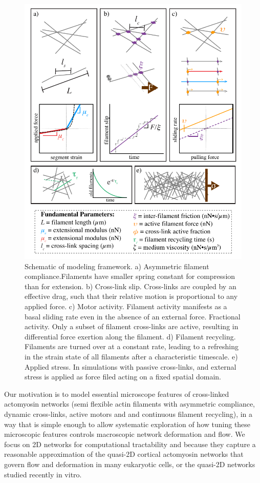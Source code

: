 \documentclass[10pt,letterpaper]{article}
\begin{document}
\begin{figure}[h!]
\centering
\includegraphics[width=\hsize]{figures/fig2/fig2}
\caption{\label{fig:sim} Schematic of modeling framework. a) Asymmetric filament compliance.Filaments have smaller spring constant for compression than for extension. b) Cross-link slip. Cross-links are coupled by an effective drag, such that their relative motion is
proportional to any applied force. c) Motor activity. Filament activity manifests as a basal sliding rate even in the absence of an external force. Fractional activity. Only a subset of filament cross-links are active, resulting in differential force exertion along the filament. d) Filament recycling. Filaments are turned over at a constant rate, leading to a refreshing in the strain state of all filaments after a characteristic timescale. e) Applied stress. In simulations with passive cross-links, and external stress is applied as force filed acting on a fixed spatial domain.}
\end{figure}

Our motivation is to model essential microscope features of cross-linked actomyosin networks (semi flexible actin filaments with asymmetric compliance, dynamic cross-links, active motors and and continuous filament recycling), in a way that is simple enough to allow systematic exploration of how tuning these microscopic features controls macroscopic network deformation and flow. We focus on 2D networks for computational tractability and because they capture a reasonable approximation of the quasi-2D cortical actomyosin networks that govern flow and deformation in many eukaryotic cells\cite{cellmech_flows, salbreuxbphs}, or the quasi-2D networks studied recently in vitro\cite{rheo_2D1,rheo_2D2}.
\end{document}
